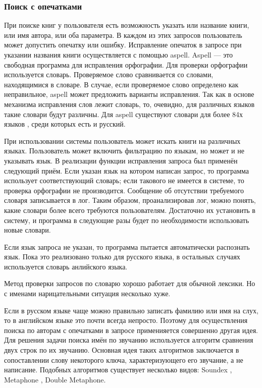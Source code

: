 \subsubsection{Поиск с опечатками}

При поиске книг у пользователя есть возможность указать или название книги, или имя автора, или оба параметра. В каждом из этих запросов пользователь может допустить опечатку или ошибку.
Исправление опечаток в запросе при указании названия книги осуществляется с помощью aspell. 
Aspell \cite{aspell} --- это свободная программа для исправления орфографии.
Для проверки орфографии используется словарь. 
Проверяемое слово сравнивается со словами, находящимися в словаре.
В случае, если проверяемое слово определено как неправильное, aspell может предложить варианты исправления. Так как в основе механизма исправления слов лежит словарь, то, очевидно, для различных языков такие словари будут различны. Для aspell существуют словари для более 84х языков \cite{langforaspell},
среди которых есть и русский.

При использовании системы пользователь может искать книги на различных языках. Пользователь может включить фильтрацию по языкам, но может и не указывать язык.
В реализации функции исправления запроса был применён следующий приём.
Если указан язык на котором написан запрос, то программа использует соответствующий словарь; если такового не имеется в системе, то проверка орфографии не производится. Сообщение об отсутствии требуемого словаря записывается в лог.
Таким образом, проанализировав лог, можно понять, какие словари более всего требуются пользователям. Достаточно их установить в систему, и программа в следующие разы будет по необходимости использовать новые словари.

Если язык запроса не указан, то программа пытается автоматически распознать язык.
Пока это реализовано только для русского языка, в остальных случаях используется словарь анлийского языка.

Метод проверки запросов по словарю хорошо работает для обычной лексики. Но с именами нарицательными ситуация несколько хуже.

Если в русском языке чаще можно правильно записать фамилию или имя на слух, то в английском языке это почти всегда непросто.
Поэтому для осуществления поиска по авторам с опечатками в запросе применияется совершенно другая идея.
Для решения задачи поиска имён по звучанию используется алгоритм сравнения двух строк по их звучанию.
Основная идея таких алгоритмов заключается в сопоставлении слову некоторого ключа, характеризующего его звучание, а не написание.
Подобных алгоритмов существует несколько видов: Soundex \cite{soundex}, Metaphone \cite{metaphone}, Double Metaphone.

